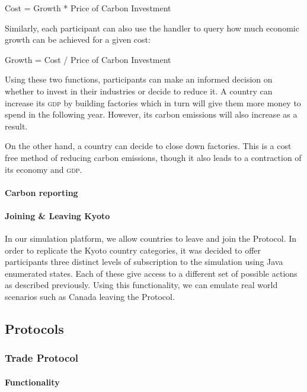 \documentclass[]{article} %
\begin{document}
\begin{center}
Cost = Growth * Price of Carbon Investment
\end{center}

Similarly, each participant can also use the handler to query how much economic growth can be achieved for a given cost:

\begin{center}
Growth = Cost / Price of Carbon Investment
\end{center}

Using these two functions, participants can make an informed decision on whether to invest in their industries or decide to reduce it. A country can increase its \textsc{gdp} by building factories which in turn will give them more money to spend in the following year. However, its carbon emissions will also increase as a result.

On the other hand, a country can decide to close down factories. This is a cost free method of reducing carbon emissions, though it also leads to a contraction of its economy and \textsc{gdp}. 

\paragraph{Carbon reporting}

\paragraph{Joining \& Leaving Kyoto}

In our simulation platform, we allow countries to leave and join the Protocol. In order to replicate the Kyoto country categories, it was decided to offer participants three distinct levels of subscription to the simulation using Java enumerated states. Each of these give access to a different set of possible actions as described previously. Using this functionality, we can emulate real world scenarios such as Canada leaving the Protocol.

\subsection{Protocols}

\subsubsection{Trade Protocol}

\paragraph{Functionality}
\end{document}
